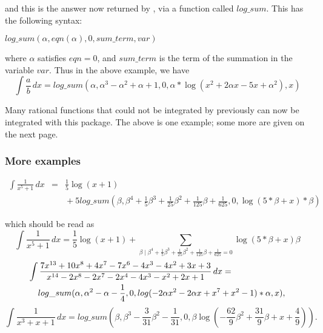 and this is the answer now returned by \REDUCE, via a function called $log\_sum$. This has the following syntax:
\begin{center}$ log\_sum(\alpha,eqn(\alpha),0,sum\_term,var)$ \end{center}
where $\alpha$ satisfies $eqn=0$, and $sum\_term$ is the term of the summation in the variable $var$. Thus in the above example, we have
\[ \int \frac{a}{b}\,dx= log\_sum(\alpha,\alpha^3-\alpha^2+\alpha+1,0,\alpha*\log(x^2+2\alpha x-5x+\alpha^2),x) \]

Many rational functions that could not be integrated by \REDUCE previously can now be integrated with this package. The above is one example; some more are given on the next page.

\subsubsection{More examples}
\begin{eqnarray*}
 \int \frac{1}{x^5+1} \, dx & = &\frac{1}{5}\log(x + 1) \\
 &  & \mbox{} + 5log\_sum(\beta,\beta^4+\frac{1}{5}\beta^3+\frac{1}{25}\beta^2+\frac{1}{125}\beta+\frac{1}{625},0,\log(5*\beta+x)*\beta) 
\end{eqnarray*}

which should be read as
\[
\int \frac{1}{x^5+1}\,dx = \frac{1}{5}\log(x+1)+\sum_{\beta \mid \beta^4+\frac{1}{5}\beta^3+\frac{1}{25}\beta^2+\frac{1}{125}\beta+\frac{1}{625}=0} \log(5*\beta+x)\beta \]
\vspace{5 mm}
\begin{eqnarray*}
\lefteqn{\int \frac{7x^{13}+10x^8+4x^7-7x^6-4x^3 -4x^2+3x+3}{x^{14}-2x^8-2x^7-2x^4-4x^3-x^2+2x+1} \, dx  =}  \\                                 
& &  log\_sum(\alpha,\alpha^2  -\alpha -\frac{1}{4},0,log( - 2\alpha x^2  - 2\alpha x + x^7  + x^2  - 1)*\alpha,x) ,
\end{eqnarray*}
\[ \int \frac{1}{x^3+x+1} \, dx = log\_sum(\beta,\beta^3-\frac{3}{31}\beta^2-\frac{1}{31},0,\beta \log(-\frac{62}{9}\beta^2+\frac{31}{9} \beta +x+\frac{4}{9})). \]

